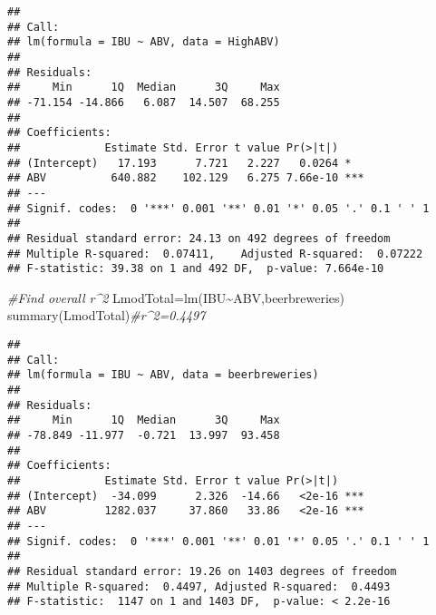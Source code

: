 \documentclass[
]{article}
\newenvironment{Shaded}{\begin{snugshade}}{\end{snugshade}}
\newcommand{\CommentTok}[1]{\textcolor[rgb]{0.56,0.35,0.01}{\textit{#1}}}
\newcommand{\FunctionTok}[1]{\textcolor[rgb]{0.00,0.00,0.00}{#1}}
\newcommand{\NormalTok}[1]{#1}
\newcommand{\OtherTok}[1]{\textcolor[rgb]{0.56,0.35,0.01}{#1}}
\newcommand{\SpecialCharTok}[1]{\textcolor[rgb]{0.00,0.00,0.00}{#1}}
\begin{document}
\begin{verbatim}
## 
## Call:
## lm(formula = IBU ~ ABV, data = HighABV)
## 
## Residuals:
##     Min      1Q  Median      3Q     Max 
## -71.154 -14.866   6.087  14.507  68.255 
## 
## Coefficients:
##             Estimate Std. Error t value Pr(>|t|)    
## (Intercept)   17.193      7.721   2.227   0.0264 *  
## ABV          640.882    102.129   6.275 7.66e-10 ***
## ---
## Signif. codes:  0 '***' 0.001 '**' 0.01 '*' 0.05 '.' 0.1 ' ' 1
## 
## Residual standard error: 24.13 on 492 degrees of freedom
## Multiple R-squared:  0.07411,    Adjusted R-squared:  0.07222 
## F-statistic: 39.38 on 1 and 492 DF,  p-value: 7.664e-10
\end{verbatim}

\begin{Shaded}
\begin{Highlighting}[]
\CommentTok{\#Find overall r\^{}2}
\NormalTok{LmodTotal}\OtherTok{=}\FunctionTok{lm}\NormalTok{(IBU}\SpecialCharTok{\textasciitilde{}}\NormalTok{ABV,beerbreweries)}
\FunctionTok{summary}\NormalTok{(LmodTotal)}\CommentTok{\#r\^{}2=0.4497}
\end{Highlighting}
\end{Shaded}

\begin{verbatim}
## 
## Call:
## lm(formula = IBU ~ ABV, data = beerbreweries)
## 
## Residuals:
##     Min      1Q  Median      3Q     Max 
## -78.849 -11.977  -0.721  13.997  93.458 
## 
## Coefficients:
##             Estimate Std. Error t value Pr(>|t|)    
## (Intercept)  -34.099      2.326  -14.66   <2e-16 ***
## ABV         1282.037     37.860   33.86   <2e-16 ***
## ---
## Signif. codes:  0 '***' 0.001 '**' 0.01 '*' 0.05 '.' 0.1 ' ' 1
## 
## Residual standard error: 19.26 on 1403 degrees of freedom
## Multiple R-squared:  0.4497, Adjusted R-squared:  0.4493 
## F-statistic:  1147 on 1 and 1403 DF,  p-value: < 2.2e-16
\end{verbatim}
\end{document}
